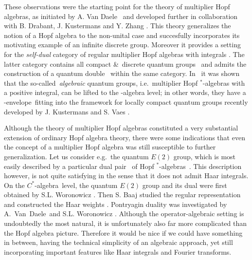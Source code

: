 These observations were the starting point for the theory of multiplier Hopf algebras,
as initiated by A. Van Daele
\cite{Fons:DQG,Fons:MHA,Fons:AFGD,Fons:AFGD:proc}\ and developed further
in collaboration with B. Drabant, J. Kustermans and Y. Zhang
\cite{FonsDra:QD,FonsDraZhang:actions,Kust:Cstar,FonsZhang:DQG,FonsZhang:coactions}\@.
This theory generalizes the notion of a Hopf algebra to the non-unital case and
succesfully incorporates its motivating example of an infinite discrete group.
Moreover it provides a setting for the {\em self-dual\/} category of
regular multiplier Hopf algebras with integrals \cite{Fons:AFGD,Fons:pnas}\@.
The latter category contains all compact \&\ discrete quantum groups \cite{AnnFons,Wor:matrix}\
and admits the construction of a quantum double \cite{FonsDra:QD}\ within the same category.
In \cite{Kust:Cstar,Kust:thesis,Kust:universal}\ it was shown that the \mbox{so-called}\
{\em algebraic\/} quantum groups, i.e.\ multiplier Hopf $^*$-algebras with a positive integral,
can be lifted to the \Cstar-algebra level; in other words, they have a \mbox{\Cstar-envelope}\
fitting into the framework for locally compact quantum groups recently
developed by J. Kustermans and S. Vaes \cite{KV,KV:cr,KV:pnas}\@.
\vspace{1ex}


Although the theory of multiplier Hopf algebras constituted a very substantial
extension of ordinary Hopf algebra theory, there were some indications that even the concept
of a multiplier Hopf algebra was still susceptible to further generalization.
Let us consider e.g.\ the quantum $E(2)$ group,
which is most easily described by a particular dual pair \UqAq\
of Hopf \mbox{$^*$-algebras}\ \cite{Koelink:QE2}\@.
This description however, is not quite satisfying in the sense that it does not admit Haar integrals.
On the \mbox{$C^*$-algebra}\ level, the quantum $E(2)$ group and its dual
were first obtained by S.L. Woronowicz \cite{Wor:QE2,Wor:Affiliated}\@.
Then S. Baaj studied the regular representation and constructed the Haar
weights \cite{Baaj:QE2}\@. Pontryagin duality was investigated by
\mbox{A. Van Daele}\ and S.L. Woronowicz \cite{FonsWor:QE2}\@.
Although the operator-algebraic setting is undoubtedly the most natural,
it is unfortunately also far more complicated than the Hopf algebra picture.
Therefore it would be nice if we could have something in between,
having the technical simplicity of an algebraic approach, yet still incorporating important
features like Haar integrals and Fourier transforms.
\vspace{1ex}


